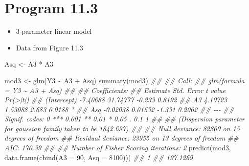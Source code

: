 \documentclass[
  10pt,
  a4paper,
]{book}
\newenvironment{Shaded}{\begin{snugshade}}{\end{snugshade}}
\newcommand{\AttributeTok}[1]{\textcolor[rgb]{0.40,0.45,0.13}{#1}}
\newcommand{\DecValTok}[1]{\textcolor[rgb]{0.68,0.00,0.00}{#1}}
\newcommand{\DocumentationTok}[1]{\textcolor[rgb]{0.37,0.37,0.37}{\textit{#1}}}
\newcommand{\FunctionTok}[1]{\textcolor[rgb]{0.28,0.35,0.67}{#1}}
\newcommand{\NormalTok}[1]{\textcolor[rgb]{0.00,0.46,0.62}{#1}}
\newcommand{\OtherTok}[1]{\textcolor[rgb]{0.00,0.46,0.62}{#1}}
\newcommand{\SpecialCharTok}[1]{\textcolor[rgb]{0.37,0.37,0.37}{#1}}
\providecommand{\tightlist}{%
  \setlength{\itemsep}{0pt}\setlength{\parskip}{0pt}}
\begin{document}
\section{Program 11.3}\label{program-11.3}

\begin{itemize}
\tightlist
\item
  3-parameter linear model
\item
  Data from Figure 11.3
\end{itemize}

\begin{Shaded}
\begin{Highlighting}[]
\NormalTok{Asq }\OtherTok{\textless{}{-}}\NormalTok{ A3 }\SpecialCharTok{*}\NormalTok{ A3}

\NormalTok{mod3 }\OtherTok{\textless{}{-}} \FunctionTok{glm}\NormalTok{(Y3 }\SpecialCharTok{\textasciitilde{}}\NormalTok{ A3 }\SpecialCharTok{+}\NormalTok{ Asq)}
\FunctionTok{summary}\NormalTok{(mod3)}
\DocumentationTok{\#\# }
\DocumentationTok{\#\# Call:}
\DocumentationTok{\#\# glm(formula = Y3 \textasciitilde{} A3 + Asq)}
\DocumentationTok{\#\# }
\DocumentationTok{\#\# Coefficients:}
\DocumentationTok{\#\#             Estimate Std. Error t value Pr(\textgreater{}|t|)  }
\DocumentationTok{\#\# (Intercept) {-}7.40688   31.74777  {-}0.233   0.8192  }
\DocumentationTok{\#\# A3           4.10723    1.53088   2.683   0.0188 *}
\DocumentationTok{\#\# Asq         {-}0.02038    0.01532  {-}1.331   0.2062  }
\DocumentationTok{\#\# {-}{-}{-}}
\DocumentationTok{\#\# Signif. codes:  0 \textquotesingle{}***\textquotesingle{} 0.001 \textquotesingle{}**\textquotesingle{} 0.01 \textquotesingle{}*\textquotesingle{} 0.05 \textquotesingle{}.\textquotesingle{} 0.1 \textquotesingle{} \textquotesingle{} 1}
\DocumentationTok{\#\# }
\DocumentationTok{\#\# (Dispersion parameter for gaussian family taken to be 1842.697)}
\DocumentationTok{\#\# }
\DocumentationTok{\#\#     Null deviance: 82800  on 15  degrees of freedom}
\DocumentationTok{\#\# Residual deviance: 23955  on 13  degrees of freedom}
\DocumentationTok{\#\# AIC: 170.39}
\DocumentationTok{\#\# }
\DocumentationTok{\#\# Number of Fisher Scoring iterations: 2}
\FunctionTok{predict}\NormalTok{(mod3, }\FunctionTok{data.frame}\NormalTok{(}\FunctionTok{cbind}\NormalTok{(}\AttributeTok{A3 =} \DecValTok{90}\NormalTok{, }\AttributeTok{Asq =} \DecValTok{8100}\NormalTok{)))}
\DocumentationTok{\#\#        1 }
\DocumentationTok{\#\# 197.1269}
\end{Highlighting}
\end{Shaded}
\end{document}
